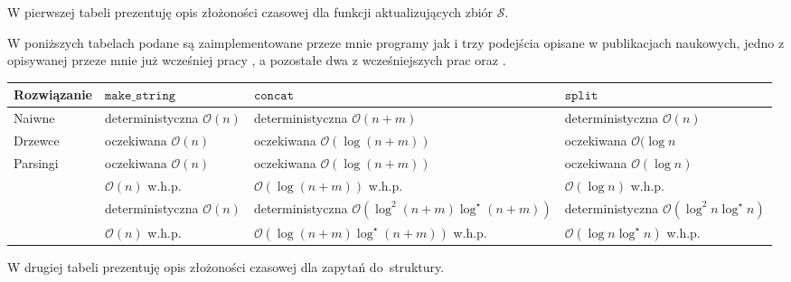 \documentclass[declaration,shortabstract]{iithesis}
\theoremstyle{definition} \newtheorem{definition}{Definicja}[chapter]
\theoremstyle{plain} \newtheorem{remark}[definition]{Obserwacja}
\theoremstyle{plain} \newtheorem{theorem}[definition]{Twierdzenie}
\theoremstyle{plain} \newtheorem{example}{Przykład}[definition]
\theoremstyle{plain} \newtheorem{lemma}[definition]{Lemat}
\begin{document}
W pierwszej tabeli prezentuję opis złożoności czasowej dla funkcji aktualizujących zbiór $\mathcal{S}$. 

W poniższych tabelach podane są zaimplementowane przeze mnie programy jak i trzy podejścia opisane w publikacjach naukowych, jedno z opisywanej przeze mnie już wcześniej pracy \cite{gawrychowski}, a pozostałe dwa z wcześniejszych prac \cite{mehlhorn} oraz \cite{alstrup}.

\begin{center}
    \begin{tabular}{ | m{3.5cm} | >{\centering\arraybackslash}m{2.8cm} | >{\centering\arraybackslash}m{2.8cm} | >{\centering\arraybackslash}m{2.8cm} | }
        \hline 
        Rozwiązanie & $\texttt{make\_string}$ & $\texttt{concat}$ & $\texttt{split}$ \\
        \hline
        Naiwne & deterministyczna $\mathcal{O}(n)$ & deterministyczna $\mathcal{O}(n + m)$ & deterministyczna $\mathcal{O}(n)$ \\
        \hline
        Drzewce & oczekiwana $\mathcal{O}(n)$ & oczekiwana $\mathcal{O}(\log(n + m))$ & oczekiwana $\mathcal{O}(\log n$ \\
        \hline
        Parsingi & oczekiwana $\mathcal{O}(n)$ & oczekiwana $\mathcal{O}(\log(n + m))$ & oczekiwana $\mathcal{O}(\log n)$ \\
        \hline
        \citeauthor{gawrychowski} & $\mathcal{O}(n)$ w.h.p. & $\mathcal{O}(\log(n + m))$ w.h.p. & $\mathcal{O}(\log n)$ w.h.p. \\
        \hline
        \citeauthor{mehlhorn} & deterministyczna $\mathcal{O}(n)$ & deterministyczna $\mathcal{O}(\log^2(n + m)\log^\star(n + m))$ & deterministyczna $\mathcal{O}(\log^2 n \log^\star n)$ \\
        \hline
        \citeauthor{alstrup} & $\mathcal{O}(n)$ w.h.p. & $\mathcal{O}(\log(n + m)\log^\star(n + m))$ w.h.p. & $\mathcal{O}(\log n \log^\star n)$ w.h.p.\\
        \hline
    \end{tabular}
\end{center}

W drugiej tabeli prezentuję opis złożoności czasowej dla zapytań do~struktury.
\end{document}
